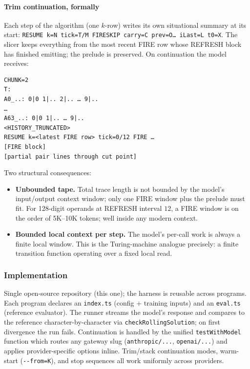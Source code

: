 \documentclass[twocolumn,switch,10pt]{article}
\providecommand{\tightlist}{\setlength{\itemsep}{0pt}\setlength{\parskip}{0pt}}
\begin{document}
\paragraph{Trim continuation, formally}\label{trim-continuation-formally}

Each step of the algorithm (one \(k\)-row) writes its own situational
summary at its start: \texttt{RESUME\ k=N\ tick=T/M\ FIRE\textbar{}SKIP\ carry=C\ prev=O…\ iLast=L\ t0=X}. The slicer keeps everything from the most
recent FIRE row whose REFRESH block has finished emitting; the
prelude is preserved. On continuation the model receives:

\begin{verbatim}
CHUNK=2
T:
A0_..: 0|0 1|.. 2|.. … 9|..
…
A63_..: 0|0 1|.. … 9|..
<HISTORY_TRUNCATED>
RESUME k=<latest FIRE row> tick=0/12 FIRE …
[FIRE block]
[partial pair lines through cut point]
\end{verbatim}

Two structural consequences:

\begin{itemize}
\tightlist
\item
  \textbf{Unbounded tape.} Total trace length is not bounded by the
  model's input/output context window; only one FIRE window plus the
  prelude must fit. For 128-digit operands at REFRESH interval \(12\),
  a FIRE window is on the order of 5K--10K tokens; well inside any
  modern context.
\item
  \textbf{Bounded local context per step.} The model's per-call work is
  always a finite local window. This is the Turing-machine analogue
  precisely: a finite transition function operating over a fixed
  local read.
\end{itemize}

\subsubsection{Implementation}\label{implementation}

Single open-source repository (this one); the harness is reusable
across programs. Each program declares an \texttt{index.ts} (config +
training inputs) and an \texttt{eval.ts} (reference evaluator). The runner
streams the model's response and compares to the reference
character-by-character via \texttt{checkRollingSolution}; on first
divergence the run fails. Continuation is handled by the unified
\texttt{testWithModel} function which routes any gateway slug
(\texttt{anthropic/...}, \texttt{openai/...}) and applies provider-specific
options inline. Trim/stack continuation modes, warm-start
(\texttt{-\/-from=K}), and stop sequences all work uniformly across providers.
\end{document}
